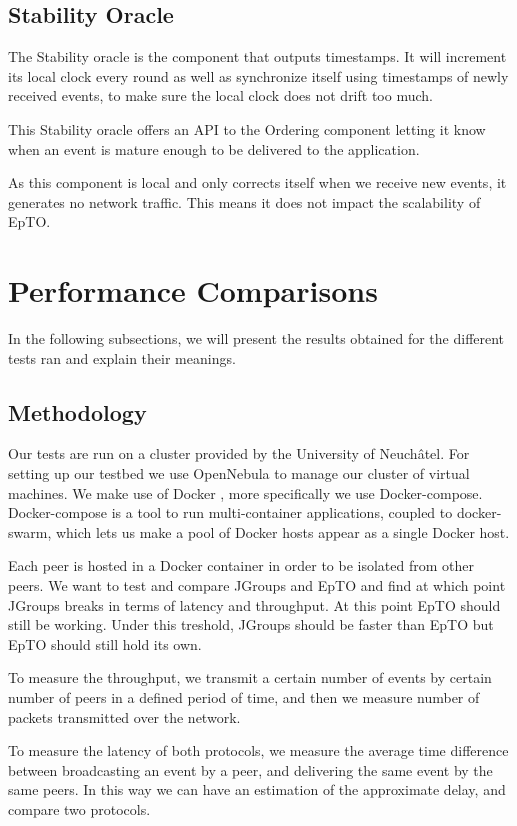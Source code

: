 \documentclass[10pt,conference,a4paper]{IEEEtran}
\begin{document}
\subsection{Stability Oracle}
The Stability oracle is the component that outputs timestamps. It will increment its local clock every round as well as synchronize itself using timestamps of newly received events, to make sure the local clock does not drift too much.
\par
This Stability oracle offers an API to the Ordering component letting it know when an event is mature enough to be delivered to the application.
\par
As this component is local and only corrects itself when we receive new events, it generates no network traffic. This means it does not impact the scalability of EpTO.
\section{Performance Comparisons}
In the following subsections, we will present the results obtained for the different tests ran and explain their meanings.
\subsection{Methodology}
\label{sub:metho}
Our tests are run on a cluster provided by the University of Neuchâtel. For setting up our testbed we use OpenNebula \autocite{opennebula} to manage our cluster of virtual machines. We make use of Docker \autocite{docker}, more specifically we use Docker-compose. Docker-compose is a tool to run multi-container applications, coupled to docker-swarm, which lets us make a pool of Docker hosts appear as a single Docker host.
\par
Each peer is hosted in a Docker container in order to be isolated from other peers. We want to test and compare JGroups and EpTO and find at which point JGroups breaks in terms of latency and throughput. At this point EpTO should still be working. Under this treshold, JGroups should be faster than EpTO but EpTO should still hold its own.
\par
To measure the throughput, we transmit a certain number of events by certain number of peers in a defined period of time, and then we measure number of packets transmitted over the network.
\par
To measure the latency of both protocols, we measure the average time difference between broadcasting an event by a peer, and delivering the same event by the same peers. In this way we can have an estimation of the approximate delay, and compare two protocols.
\end{document}
